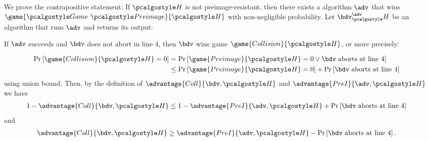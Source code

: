 \ifsolutions
\begin{mysolution}
  We prove the contrapositive statement:
  If $\algo{H}$ is not preimage-resistant, then there exists a \ppt algorithm $\adv$ that wins $\game{\Game~\algo{Preimage}}{\algo{H}}$ with non-negligible probability.
  Let $\bdv^\adv_\algo{H}$ be an algorithm that runs $\adv$ and returns its output:
  
  \begin{center}
    \begin{tcolorbox}[width=4cm]
      \begin{pchstack}[center]
      \end{pchstack}
    \end{tcolorbox}
  \end{center}
  
  If $\adv$ succeeds and $\bdv$ does not abort in line 4, then $\bdv$ wins game $\game{Collision}{\algo{H}}$, or more precisely:

  \begin{align*}
  \pr{\game{Collision}{\algo{H}} = 0} &= \pr{\game{Preimage}{\algo{H}} = 0 \vee \bdv \text{ aborts at line 4} } \\
  &\le \pr{\game{Preimage}{\algo{H}} = 0} + \pr{\bdv \text{ aborts at line 4} } \\
  \end{align*}
  using union bound.
  Then, by the definition of $\advantage{Coll}{\bdv, \algo{H}}$ and $\advantage{PreI}{\adv, \algo{H}}$ we have
  \begin{align*}
    1 - \advantage{Coll}{\bdv, \algo{H}} &\le 1 - \advantage{PreI}{\adv, \algo{H}} + \pr{\bdv \text{ aborts at line 4} }\\
  \end{align*}
  and
  \begin{align*}
    \advantage{Coll}{\bdv, \algo{H}} &\ge \advantage{PreI}{\adv, \algo{H}} - \pr{\bdv \text{ aborts at line 4} }.\\
  \end{align*}
  

\end{mysolution}
